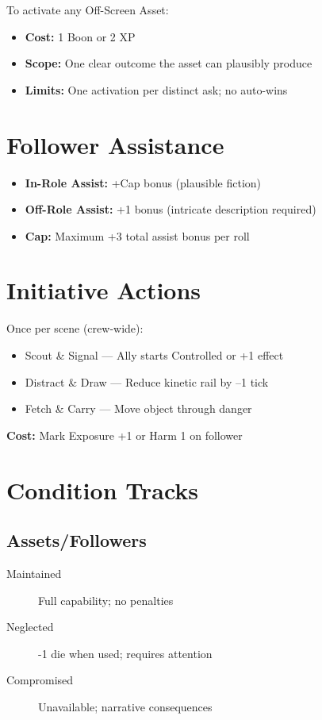 To activate any Off-Screen Asset:
\begin{itemize}
  \item \textbf{Cost:} 1 Boon or 2 XP
  \item \textbf{Scope:} One clear outcome the asset can plausibly produce
  \item \textbf{Limits:} One activation per distinct ask; no auto-wins
\end{itemize}

\section{Follower Assistance}

\begin{itemize}
  \item \textbf{In-Role Assist:} +Cap bonus (plausible fiction)
  \item \textbf{Off-Role Assist:} +1 bonus (intricate description required)
  \item \textbf{Cap:} Maximum +3 total assist bonus per roll
\end{itemize}

\section{Initiative Actions}

Once per scene (crew-wide):
\begin{itemize}
  \item Scout \& Signal — Ally starts Controlled or +1 effect
  \item Distract \& Draw — Reduce kinetic rail by –1 tick
  \item Fetch \& Carry — Move object through danger
\end{itemize}
\textbf{Cost:} Mark Exposure +1 or Harm 1 on follower

\section{Condition Tracks}

\subsection*{Assets/Followers}
\begin{description}
  \item[Maintained] Full capability; no penalties
  \item[Neglected] -1 die when used; requires attention
  \item[Compromised] Unavailable; narrative consequences
\end{description}

